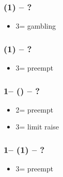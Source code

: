 

\subsubsection*{(1\diams) -- ?}
\begin{itemize}
    \item 3\diams = gambling \clubs
\end{itemize}

\subsubsection*{(1\clubs) -- ?}
\begin{itemize}
    \item 3\clubs = \clubs preempt
\end{itemize}

\subsubsection*{1\clubs -- (\dbl) -- ?}
\begin{itemize}
    \item 2\nt = preempt \clubs
    \item 3\clubs = limit raise
\end{itemize}

\subsubsection*{1\clubs -- (1) -- ?}
\begin{itemize}
    \item 3\clubs = preempt
\end{itemize}


